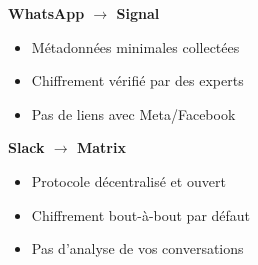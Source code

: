 \documentclass[a0paper,portrait]{baposter}
\begin{document}
\begin{poster}
{  \vspace{0.5em}

  \noindent
  \begin{minipage}[t]{0.28\linewidth}
  \end{minipage}%
  \begin{minipage}[t]{0.7\linewidth}
    \hspace{0.5em}
    \textbf{\color{c4dtblue}WhatsApp $\rightarrow$ Signal}
    \begin{itemize}
      \item Métadonnées minimales collectées
      \item Chiffrement vérifié par des experts
      \item Pas de liens avec Meta/Facebook
    \end{itemize}
  \end{minipage}

  \vspace{0.5em}

  \noindent
  \begin{minipage}[t]{0.7\linewidth}
    \textbf{\color{c4dtblue}Slack $\rightarrow$ Matrix}
    \begin{itemize}
      \item Protocole décentralisé et ouvert
      \item Chiffrement bout-à-bout par défaut
      \item Pas d'analyse de vos conversations
    \end{itemize}
  \end{minipage}%
  \begin{minipage}[t]{0.28\linewidth}
    \hspace{0.5em}
  \end{minipage}
}

\end{poster}
\end{document}
